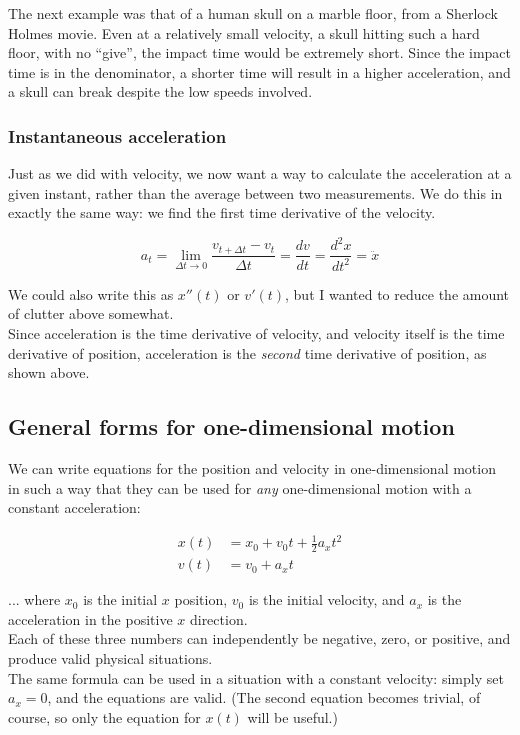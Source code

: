 \documentclass[8.01x]{subfiles}
\begin{document}
The next example was that of a human skull on a marble floor, from a Sherlock Holmes movie. Even at a relatively small velocity, a skull hitting such a hard floor, with no ``give'', the impact time would be extremely short. Since the impact time is in the denominator, a shorter time will result in a higher acceleration, and a skull can break despite the low speeds involved. 

\subsubsection{Instantaneous acceleration}

Just as we did with velocity, we now want a way to calculate the acceleration at a given instant, rather than the average between two measurements. We do this in exactly the same way: we find the first time derivative of the velocity.

\begingroup
\large
\begin{equation}
 a_t = \lim_{\Delta t \to 0} \frac{v_{t + \Delta t} - v_t}{\Delta t} = \frac{dv}{dt} = \frac{d^2x}{dt^2} = \ddot{x}
\end{equation}
\endgroup

We could also write this as $x''(t)$ or $v'(t)$, but I wanted to reduce the amount of clutter above somewhat.\\
Since acceleration is the time derivative of velocity, and velocity itself is the time derivative of position, acceleration is the \emph{second} time derivative of position, as shown above.

\subsection{General forms for one-dimensional motion}

We can write equations for the position and velocity in one-dimensional motion in such a way that they can be used for \emph{any} one-dimensional motion with a constant acceleration:

\begin{align}
x(t) &= x_0 + v_0 t + \frac{1}{2} a_x t^2\\
v(t) &= v_0 + a_x t
\end{align}

... where $x_0$ is the initial $x$ position, $v_0$ is the initial velocity, and $a_x$ is the acceleration in the positive $x$ direction.\\
Each of these three numbers can independently be negative, zero, or positive, and produce valid physical situations.\\
The same formula can be used in a situation with a constant velocity: simply set $a_x = 0$, and the equations are valid. (The second equation becomes trivial, of course, so only the equation for $x(t)$ will be useful.)
\end{document}
